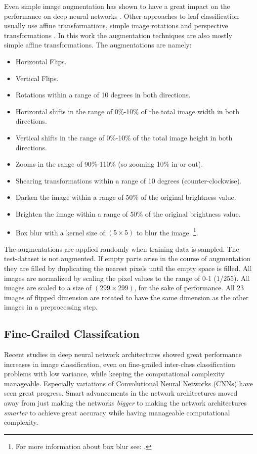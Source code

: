 \documentclass[10pt,twocolumn,letterpaper]{article}
\begin{document}
Even simple image augmentation has shown to have a great impact on the performance on deep neural networks \cite{perez2017effectiveness, simard2003best}. Other approaches to leaf classification usually use affine transformations, simple image rotations and perspective transformations \cite{sladojevic2016deep, wick2017leaf}. In this work the augmentation techniques are also mostly simple affine transformations. The augmentations are namely:
\begin{itemize}
	\setlength\itemsep{0.1em} 
  	\item Horizontal Flips.
	\item Vertical Flips.
	\item Rotations within a range of 10 degrees in both directions.
	\item Horizontal shifts in the range of 0\%-10\% of the total image width in both directions.
	\item Vertical shifts in the range of 0\%-10\% of the total image height in both directions.
	\item Zooms in the range of 90\%-110\% (so zooming 10\% in or out).
	\item Shearing transformations within a range of 10 degrees (counter-clockwise).
	\item Darken the image within a range of 50\% of the original brightness value.
	\item Brighten the image within a range of 50\% of the original brightness value.
	\item Box blur with a kernel size of $(5\times 5)$ to blur the image. \footnote{For more information about box blur see: \cite{wiki:blur}.}.
\end{itemize}
The augmentations are applied randomly when training data is sampled. The test-dataset is not augmented. If empty parts arise in the course of augmentation they are filled by duplicating the nearest pixels until the empty space is filled. All images are normalized by scaling the pixel values to the range of 0-1 ($1/255$). All images are scaled to a size of $(299 \times 299)$, for the sake of performance. All 23 images of flipped dimension are rotated to have the same dimension as the other images in a preprocessing step.
\subsection{Fine-Grailed Classifcation} \label{ensemble}
Recent studies in deep neural network architectures showed great performance increases in image classification, even on fine-grailed inter-class classification problems with low variance, while keeping the computational complexity manageable.  Especially variations of Convolutional Neural Networks (CNNs) have seen great progress. Smart advancements in the network architectures moved away from just making the networks \textit{bigger} to making the network architectures \textit{smarter} to achieve great accuracy while having manageable computational complexity.
\end{document}
